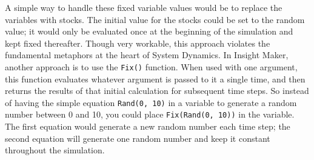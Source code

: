 \documentclass[]{memoir}
\begin{document}
A simple way to handle these fixed variable values would be to replace
the variables with stocks. The initial value for the stocks could be set
to the random value; it would only be evaluated once at the beginning of
the simulation and kept fixed thereafter. Though very workable, this
approach violates the fundamental metaphors at the heart of System
Dynamics. In Insight Maker, another approach is to use the
\lstinline!Fix()! function. When used with one argument, this function
evaluates whatever argument is passed to it a single time, and then
returns the results of that initial calculation for subsequent time
steps. So instead of having the simple equation \lstinline!Rand(0, 10)!
in a variable to generate a random number between 0 and 10, you could
place \lstinline!Fix(Rand(0, 10))! in the variable. The first equation
would generate a new random number each time step; the second equation
will generate one random number and keep it constant throughout the
simulation.

\FloatBarrier 
\end{document}
